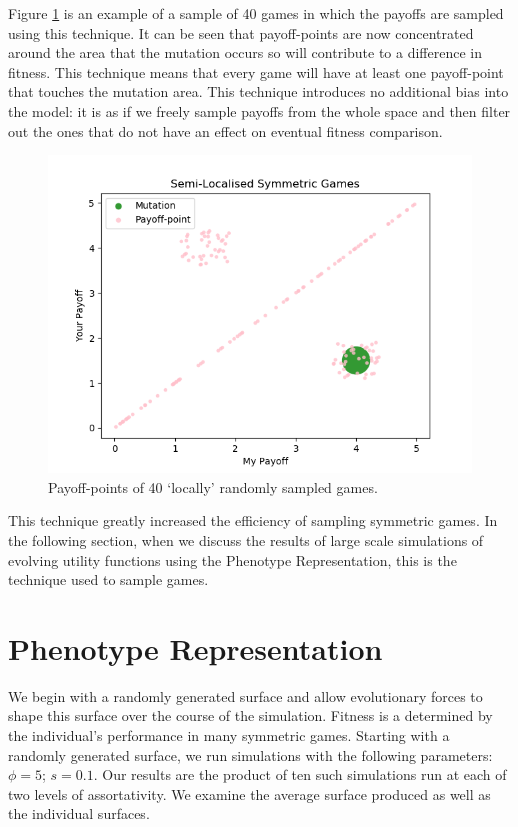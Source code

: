 \documentclass[11pt]{book}
\newcommand*{\np}{\par\noindent\newline}
\begin{document}
\noindent Figure \ref{local_symmetric_payoff_plot} is an example of a sample of 40 games in which the payoffs are sampled using this technique.
It can be seen that payoff-points are now concentrated around the area that the mutation occurs so will contribute to a difference in fitness.
This technique means that every game will have at least one payoff-point that touches the mutation area.
This technique introduces no additional bias into the model: it is as if we freely sample payoffs from the whole space and then filter out the ones that do not have an effect on eventual fitness comparison.

\begin{figure}
	\centering
	\includegraphics[scale=0.7]{resources/localised_symmetric_game_mutation.png}
	\caption{Payoff-points of 40 `locally' randomly sampled games.}
	\label{local_symmetric_payoff_plot}
\end{figure}

\np This technique greatly increased the efficiency of sampling symmetric games.
In the following section, when we discuss the results of large scale simulations of evolving utility functions using the Phenotype Representation, this is the technique used to sample games.

\section{Phenotype Representation}\label{symmetricGames_pheno}
We begin with a randomly generated surface and allow evolutionary forces to shape this surface over the course of the simulation.
Fitness is a determined by the individual's performance in many symmetric games.
Starting with a randomly generated surface, we run simulations with the following parameters: $\phi = 5$; $s = 0.1$.
Our results are the product of ten such simulations run at each of two levels of assortativity.
We examine the average surface produced as well as the individual surfaces.
\end{document}
